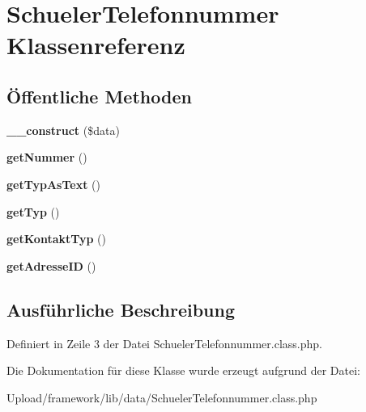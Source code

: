 \hypertarget{class_schueler_telefonnummer}{}\section{Schueler\+Telefonnummer Klassenreferenz}
\label{class_schueler_telefonnummer}
\subsection*{Öffentliche Methoden}
\begin{DoxyCompactItemize}
\item 
\mbox{\label{class_schueler_telefonnummer_af8950307cea85451097195d83cc0c9ff}} 
{\bfseries \+\_\+\+\_\+construct} (\$data)
\item 
\mbox{\label{class_schueler_telefonnummer_a5d9feac10332697e8c56040c99804387}} 
{\bfseries get\+Nummer} ()
\item 
\mbox{\label{class_schueler_telefonnummer_a10c70669f3aca7017d73c97464f608cd}} 
{\bfseries get\+Typ\+As\+Text} ()
\item 
\mbox{\label{class_schueler_telefonnummer_a658cdcc00bd0efb2973f367246196400}} 
{\bfseries get\+Typ} ()
\item 
\mbox{\label{class_schueler_telefonnummer_a6d61ffde7ea024a79a1923c6bd52ea2c}} 
{\bfseries get\+Kontakt\+Typ} ()
\item 
\mbox{\label{class_schueler_telefonnummer_a81e1e801bc1e72f5e83e7655c047c659}} 
{\bfseries get\+Adresse\+ID} ()
\end{DoxyCompactItemize}


\subsection{Ausführliche Beschreibung}


Definiert in Zeile 3 der Datei Schueler\+Telefonnummer.\+class.\+php.



Die Dokumentation für diese Klasse wurde erzeugt aufgrund der Datei\+:\begin{DoxyCompactItemize}
\item 
Upload/framework/lib/data/Schueler\+Telefonnummer.\+class.\+php\end{DoxyCompactItemize}
